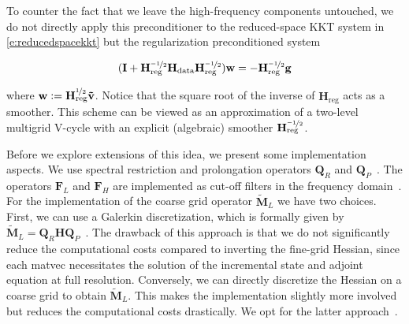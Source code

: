 \documentclass[11pt]{amsart}
\newcommand\di[1]{\ensuremath{\mathbf{#1}}}
\newcommand{\defeq}{\ensuremath{\mathrel{\mathop:}=}}
\begin{document}
\noindent To counter the fact that we leave the high-frequency components untouched, we do not directly apply this preconditioner to the reduced-space KKT system in \eqref{e:reducedspacekkt} but the regularization preconditioned system

\[
(\di{I} + \di{H}_{\text{reg}}^{\nicefrac{-1}{2}} \di{H}_{\text{data}}\di{H}_{\text{reg}}^{\nicefrac{-1}{2}}) \di{w} = - \di{H}_{\text{reg}}^{\nicefrac{-1}{2}} \di{g}
\]

\noindent where $\di{w} \defeq \di{H}_{\text{reg}}^{\nicefrac{1}{2}} \di{\tilde{v}}$. Notice that the square root of the inverse of $\di{H}_{\text{reg}}$ acts as a smoother. This scheme can be viewed as an approximation of a two-level multigrid V-cycle with an explicit (algebraic) smoother $\di{H}_{\text{reg}}^{\nicefrac{-1}{2}}$.

Before we explore extensions of this idea, we present some implementation aspects. We use spectral restriction and prolongation operators $\di{Q}_R$ and $\di{Q}_P$~\cite{Mang:2019a,Mang:2017a}. The operators $\di{F}_L$ and $\di{F}_H$ are implemented as cut-off filters in the frequency domain~\cite{Mang:2019a,Mang:2017a}. For the implementation of the coarse grid operator $\di{\tilde{M}}_L$ we have two choices. First, we can use a Galerkin discretization, which is formally given by $\di{\tilde{M}}_L = \di{Q}_R\di{H}\di{Q}_P$~\cite{Briggs:2000a}. The drawback of this approach is that we do not significantly reduce the computational costs compared to inverting the fine-grid Hessian, since each matvec necessitates the solution of the incremental state and adjoint equation at full resolution. Conversely, we can directly discretize the Hessian on a coarse grid to obtain $\di{\tilde{M}}_L$. This makes the implementation slightly more involved but reduces the computational costs drastically. We opt for the latter approach~\cite{Mang:2019a,Mang:2017a}.
\end{document}
